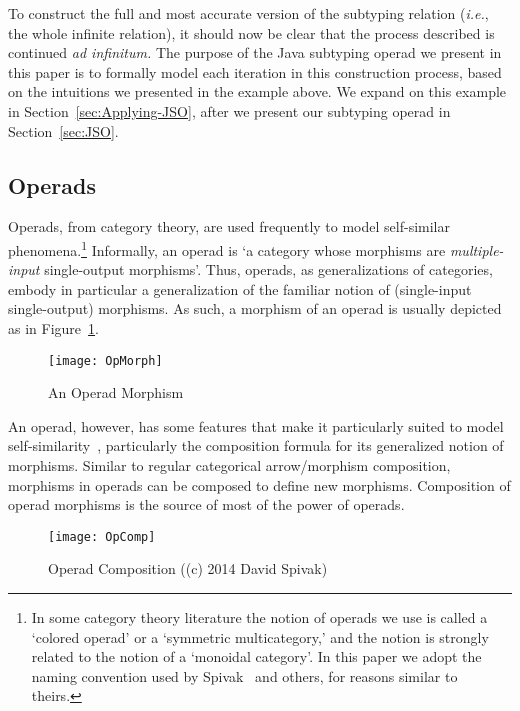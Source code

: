 \documentclass[twocolumn,english]{article}
\numberwithin{equation}{section}
\numberwithin{figure}{section}
\begin{document}
To construct the full and most accurate version of the subtyping relation
(\emph{i.e.}, the whole infinite relation), it should now be clear
that the process described is continued \emph{ad infinitum.} The purpose
of the Java subtyping operad we present in this paper is to formally
model each iteration in this construction process, based on the intuitions
we presented in the example above. We expand on this example in Section~\ref{sec:Applying-JSO},
after we present our subtyping operad in Section~\ref{sec:JSO}.


\subsection{Operads}

Operads, from category theory, are used frequently to model self-similar
phenomena.\footnote{In some category theory literature the notion of operads we use is
called a `colored operad' or a `symmetric multicategory,' and
the notion is strongly related to the notion of a `monoidal category'.
In this paper we adopt the naming convention used by Spivak~\cite{spivak2014category}
and others, for reasons similar to theirs.} Informally, an operad is `a category whose morphisms are \emph{multiple-input}
single-output morphisms'. Thus, operads, as generalizations of categories,
embody in particular a generalization of the familiar notion of (single-input
single-output) morphisms. As such, a morphism of an operad is usually
depicted as in Figure~\ref{fig:An-Operad-Morphism}.

\begin{figure}
\noindent \begin{centering}
\texttt{[image: OpMorph]}
\par\end{centering}

\protect\caption{\label{fig:An-Operad-Morphism}An Operad Morphism}
\end{figure}


An operad, however, has some features that make it particularly suited
to model self-similarity~\cite{spivak2014category}, particularly
the composition formula for its generalized notion of morphisms. Similar
to regular categorical arrow/morphism composition, morphisms in operads
can be composed to define new morphisms. Composition of operad morphisms
is the source of most of the power of operads.

\begin{figure}
\noindent \begin{centering}
\texttt{[image: OpComp]}
\par\end{centering}

\protect\caption{\label{fig:Operad-Composition}Operad Composition ((c) 2014 David
Spivak)}
\end{figure}
\end{document}
